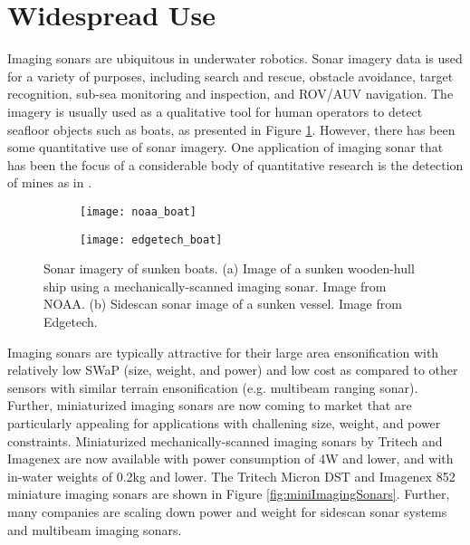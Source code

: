 \section{Widespread Use}
\label{sonar.Widespread}

Imaging sonars are ubiquitous in underwater robotics.
Sonar imagery data is used for a variety of purposes, including search and rescue, obstacle avoidance, target recognition, sub-sea monitoring and inspection, and ROV/AUV navigation. 
The imagery is usually used as a qualitative tool for human operators to detect seafloor objects such as boats, as presented in Figure \ref{fig:boats}.
However, there has been some quantitative use of sonar imagery.
One application of imaging sonar that has been the focus of a considerable body of quantitative research is the detection of mines as in \cite{Reed2003}. 

\begin{figure}[!h]
	\centering
	\begin{subfigure}[b]{0.51\textwidth}
                \texttt{[image: noaa\_boat]}
                \caption{}
  	\end{subfigure}
  	\centering
	\begin{subfigure}[b]{0.45\textwidth}
                \texttt{[image: edgetech\_boat]}
                \caption{}
  	\end{subfigure}
	\caption{Sonar imagery of sunken boats. (a) Image of a sunken wooden-hull ship using a mechanically-scanned imaging sonar.  Image from NOAA. (b) Sidescan sonar image of a sunken vessel.  Image from Edgetech. }	
	\label{fig:boats}
\end{figure}

Imaging sonars are typically attractive for their large area ensonification with relatively low SWaP (size, weight, and power) and low cost as compared to other sensors with similar terrain ensonification (e.g. multibeam ranging sonar).
Further, miniaturized imaging sonars are now coming to market that are particularly appealing for applications with challening size, weight, and power constraints.  Miniaturized mechanically-scanned imaging sonars by Tritech and Imagenex are now available with power consumption of 4W and lower, and with in-water weights of 0.2kg and lower.  The Tritech Micron DST and Imagenex 852 miniature imaging sonars are shown in Figure \ref{fig:miniImagingSonars}.  Further, many companies are scaling down power and weight for sidescan sonar systems and multibeam imaging sonars.

